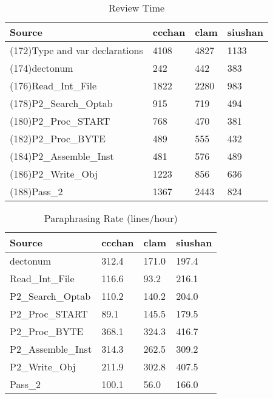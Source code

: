 \begin{table}[hb]
\begin{center}
\begin{tabular}{|l|l|l|l|}
\hline
Source & ccchan & clam & siushan\\
\hline
(172)Type and var declarations & 4108 & 4827 & 1133\\
(174)dectonum & 242 & 442 & 383\\
(176)Read\_Int\_File & 1822 & 2280 & 983\\
(178)P2\_Search\_Optab & 915 & 719 & 494\\
(180)P2\_Proc\_START & 768 & 470 & 381\\
(182)P2\_Proc\_BYTE & 489 & 555 & 432\\
(184)P2\_Assemble\_Inst & 481 & 576 & 489\\
(186)P2\_Write\_Obj & 1223 & 856 & 636\\
(188)Pass\_2 & 1367 & 2443 & 824\\
\hline
\end{tabular}
\end{center}
\caption{Review Time}
\end{table}

\begin{table}[hb]
\begin{center}
\begin{tabular}{|l|l|l|l|}
\hline
Source & ccchan & clam & siushan\\
\hline
dectonum & 312.4 & 171.0 & 197.4\\
Read\_Int\_File & 116.6 & 93.2 & 216.1\\
P2\_Search\_Optab & 110.2 & 140.2 & 204.0\\
P2\_Proc\_START & 89.1 & 145.5 & 179.5\\
P2\_Proc\_BYTE & 368.1 & 324.3 & 416.7\\
P2\_Assemble\_Inst & 314.3 & 262.5 & 309.2\\
P2\_Write\_Obj & 211.9 & 302.8 & 407.5\\
Pass\_2 & 100.1 & 56.0 & 166.0\\
\hline
\end{tabular}
\end{center}
\caption{Paraphrasing Rate (lines/hour)}
\end{table}

